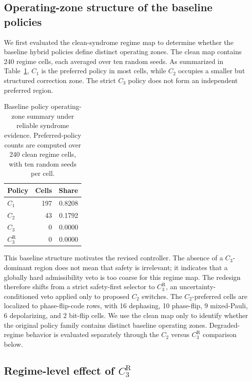 \documentclass{iopjournal}
\begin{document}
\subsection{Operating-zone structure of the baseline policies}\label{subsec:results-operating-zones}

We first evaluated the clean-syndrome regime map to determine whether the baseline
hybrid policies define distinct operating zones. The clean map contains 240
regime cells, each averaged over ten random seeds. As summarized in
Table~\ref{tab:operating-zone-summary}, $C_1$ is the preferred policy in most
cells, while $C_2$ occupies a smaller but structured correction zone. The strict
$C_3$ policy does not form an independent preferred region.

\begin{table}[t]
\caption{Baseline policy operating-zone summary under reliable syndrome evidence.
Preferred-policy counts are computed over 240 clean regime cells, with ten random
seeds per cell.}
\label{tab:operating-zone-summary}
\centering
\scriptsize
\setlength{\tabcolsep}{5pt}
\begin{tabular}{@{}lrr@{}}
\toprule
Policy & Cells & Share \\
\midrule
$C_1$ & 197 & 0.8208 \\
$C_2$ & 43 & 0.1792 \\
$C_3$ & 0 & 0.0000 \\
$C_3^{\mathrm R}$ & 0 & 0.0000 \\
\bottomrule
\end{tabular}
\end{table}

This baseline structure motivates the revised controller. The absence of a
$C_3$-dominant region does not mean that safety is irrelevant; it indicates that a
globally hard admissibility veto is too coarse for this regime map. The redesign
therefore shifts from a strict safety-first selector to $C_3^{\mathrm R}$, an
uncertainty-conditioned veto applied only to proposed $C_2$ switches.
The $C_2$-preferred cells are localized to phase-flip-code rows, with 16
dephasing, 10 phase-flip, 9 mixed-Pauli, 6 depolarizing, and 2 bit-flip cells.
We use the clean map only to identify whether the original policy family contains
distinct baseline operating zones. Degraded-regime behavior is evaluated
separately through the $C_2$ versus $C_3^{\mathrm R}$ comparison below.

\FloatBarrier

\subsection{Regime-level effect of \texorpdfstring{$C_3^{\mathrm R}$}{C3R}}\label{subsec:results-regime-effect}
\end{document}

